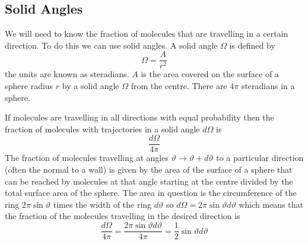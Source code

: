 \documentclass{article}
\begin{document}
    \subsection{Solid Angles}
    We will need to know the fraction of molecules that are travelling in a certain direction.
    To do this we can use solid angles.
    A solid angle \(\Omega\) is defined by
    \[\Omega = \frac{A}{r^2}\]
    the units are known as steradians.
    \(A\) is the area covered on the surface of a sphere radius \(r\) by a solid angle \(\Omega\) from the centre.
    There are \(4\pi\) steradians in a sphere.
    
    If molecules are travelling in all directions with equal probability then the fraction of molecules with trajectories in a solid angle \(d\Omega\) is
    \[\frac{d\Omega}{4\pi}\]
    The fraction of molecules travelling at angles \(\vartheta\to\vartheta + d\vartheta\) to a particular direction (often the normal to a wall) is given by the area of the surface of a sphere that can be reached by molecules at that angle starting at the centre divided by the total surface area of the sphere.
    The area in question is the circumference of the ring \(2\pi\sin\vartheta\) times the width of the ring \(d\vartheta\) so \(d\Omega = 2\pi\sin\vartheta d\vartheta\) which means that the fraction of the molecules travelling in the desired direction is
    \[\frac{d\Omega}{4\pi} = \frac{2\pi\sin\vartheta d\vartheta}{4\pi} = \frac{1}{2}\sin\vartheta d\vartheta\]
    
\end{document}
